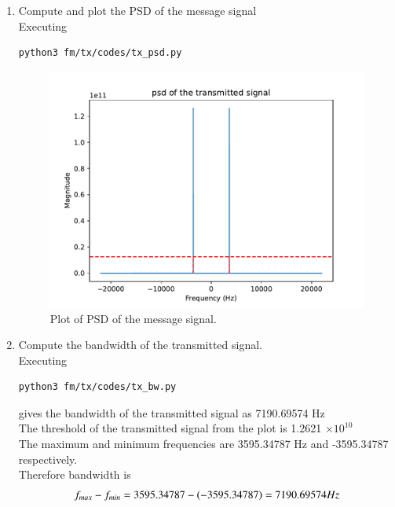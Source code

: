 \begin{enumerate}[label=\arabic*.,ref=\thesection.\theenumi]
\begin{figure}{H}
\caption{Plot of spectrum of transmitted signal.}
\label{fig:Trans}
\end{figure}
\item Compute and plot the PSD of the message signal 
\\
	\solution
Executing	
\begin{lstlisting}
python3 fm/tx/codes/tx_psd.py
\end{lstlisting}

\begin{figure}[H]
\centering
\includegraphics[width=\columnwidth]{fm/tx/figs/tx_psd.pdf}
\caption{Plot of PSD of the message signal.}
\label{fig:fm_PSD}
\end{figure}
\item Compute the bandwidth of the transmitted signal.
\\
\solution
Executing
\begin{lstlisting}
python3 fm/tx/codes/tx_bw.py
\end{lstlisting}
gives the bandwidth of the transmitted signal as 7190.69574 Hz
\\
The threshold of the transmitted signal from the plot is 1.2621 $\times 10^{10}$
\\
The maximum and minimum frequencies are 3595.34787 Hz and -3595.34787 respectively.
\\
Therefore bandwidth is\\
\begin{align}
\centering
f_{max}-f_{min} = 3595.34787-(-3595.34787) = 7190.69574 Hz
\end{align}

\end{enumerate}
